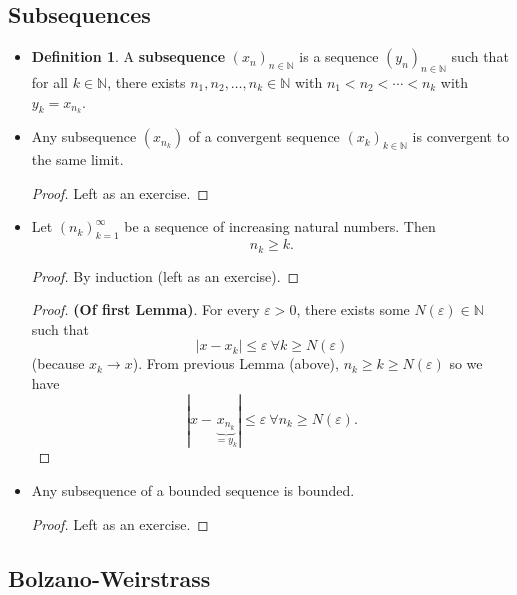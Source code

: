 \documentclass{article}
\newcommand{\N}{\mathbb{N}}
\newcommand{\seq}[2]{(#1_{#2})_{#2 \in \N}}
\newcommand{\?}{\stackrel{?}{=}}
\theoremstyle{definition} %
\newtheorem{definition}[subsection]{Definition} %
\begin{document}
\subsection{Subsequences}

\begin{itemize}
    \item[]
    \begin{definition}
        A \textbf{subsequence} $\seq{x}{n}$ is a sequence $\seq{y}{n}$ such that for all $k \in \N$, there exists $n_1, n_2, \ldots, n_k \in \N$ with $n_1 < n_2 < \cdots < n_k$ with $y_k = x_{n_k}$.
    \end{definition}
    \item[]
    \begin{lemma}
        Any subsequence $(x_{n_k})$ of a convergent sequence $\seq{x}{k}$ is convergent to the same limit.
    \end{lemma}
    \begin{proof}
        Left as an exercise.
    \end{proof}
    \item[]
    \begin{lemma}
        Let $(n_k)_{k = 1}^{\infty}$ be a sequence of increasing natural numbers. Then
    $$n_k \geq k.$$
    \end{lemma}
    \begin{proof}
        By induction (left as an exercise).
    \end{proof}
    \begin{proof}
        \textbf{(Of first Lemma)}. For every $\varepsilon > 0$, there exists some $N(\varepsilon) \in \N$ such that
        $$|x - x_k| \leq \varepsilon \ \forall k \geq N(\varepsilon)$$
        (because $x_k \rightarrow x$). From previous Lemma (above), $n_k \geq k \geq N(\varepsilon)$ so we have
        $$|x - \underbrace{x_{n_k}}_{ = y_k}| \leq \varepsilon \ \forall n_k \geq N(\varepsilon).$$
    \end{proof}
    \item[]
    \begin{lemma}
        Any subsequence of a bounded sequence is bounded.
    \end{lemma}
    \begin{proof}
        Left as an exercise.
    \end{proof}
\end{itemize}

\subsection{Bolzano-Weirstrass}
\end{document}
